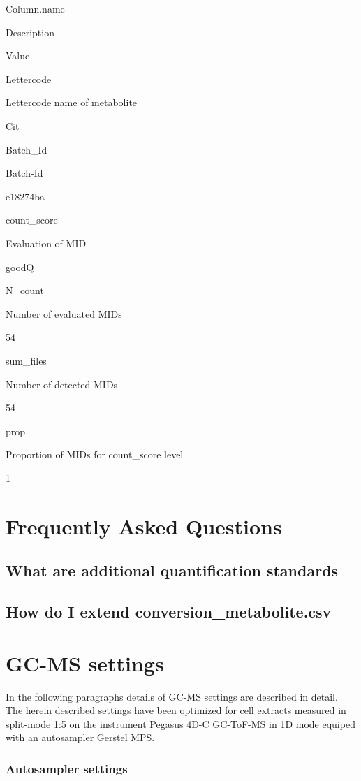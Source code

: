 \documentclass[]{book}
\theoremstyle{definition}
\theoremstyle{definition}
\theoremstyle{definition}
\theoremstyle{remark}
\begin{document}
Column.name

Description

Value

Lettercode

Lettercode name of metabolite

Cit

Batch\_Id

Batch-Id

e18274ba

count\_score

Evaluation of MID

goodQ

N\_count

Number of evaluated MIDs

54

sum\_files

Number of detected MIDs

54

prop

Proportion of MIDs for count\_score level

1

\chapter{Frequently Asked Questions}\label{FAQ}

\section{What are additional quantification
standards}\label{what-are-additional-quantification-standards}

\section{How do I extend
conversion\_metabolite.csv}\label{how-do-i-extend-conversion_metabolite.csv}

\chapter{GC-MS settings}\label{gcms}

In the following paragraphs details of GC-MS settings are described in
detail. The herein described settings have been optimized for cell
extracts measured in split-mode 1:5 on the instrument Pegasus 4D-C
GC-ToF-MS in 1D mode equiped with an autosampler Gerstel MPS.

\subsection{Autosampler settings}\label{autosampler-settings}
\end{document}
